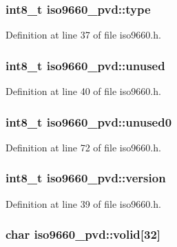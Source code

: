 \hypertarget{structiso9660__pvd_a6b7919d1112f6300190b5631fb043d05}{
\subsubsection[{type}]{\setlength{\rightskip}{0pt plus 5cm}int8\+\_\+t iso9660\+\_\+pvd\+::type}}\label{structiso9660__pvd_a6b7919d1112f6300190b5631fb043d05}


Definition at line 37 of file iso9660.\+h.

\hypertarget{structiso9660__pvd_a6c4091535d70ca1acc3b577223849988}{
\subsubsection[{unused}]{\setlength{\rightskip}{0pt plus 5cm}int8\+\_\+t iso9660\+\_\+pvd\+::unused}}\label{structiso9660__pvd_a6c4091535d70ca1acc3b577223849988}


Definition at line 40 of file iso9660.\+h.

\hypertarget{structiso9660__pvd_a4084400e5a30ae71df0165f3a0e5e566}{
\subsubsection[{unused0}]{\setlength{\rightskip}{0pt plus 5cm}int8\+\_\+t iso9660\+\_\+pvd\+::unused0}}\label{structiso9660__pvd_a4084400e5a30ae71df0165f3a0e5e566}


Definition at line 72 of file iso9660.\+h.

\hypertarget{structiso9660__pvd_ad4df80ddd241987b2e4ca9854fdb8780}{
\subsubsection[{version}]{\setlength{\rightskip}{0pt plus 5cm}int8\+\_\+t iso9660\+\_\+pvd\+::version}}\label{structiso9660__pvd_ad4df80ddd241987b2e4ca9854fdb8780}


Definition at line 39 of file iso9660.\+h.

\hypertarget{structiso9660__pvd_a931f1452623da253d46c1fa9f8ce48e7}{
\subsubsection[{volid}]{\setlength{\rightskip}{0pt plus 5cm}char iso9660\+\_\+pvd\+::volid\mbox{[}32\mbox{]}}}\label{structiso9660__pvd_a931f1452623da253d46c1fa9f8ce48e7}


